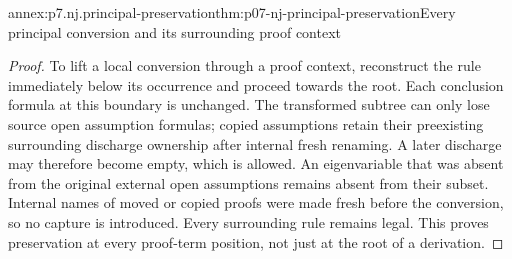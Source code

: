 \begin{annexitem}{annex:p7.nj.principal-preservation}{thm:p07-nj-principal-preservation}{Every principal conversion and its surrounding proof context}
\begin{proof}
To lift a local conversion through a proof context, reconstruct
the rule immediately below its occurrence and proceed towards
the root. Each conclusion formula at this boundary is unchanged.
The transformed subtree can only lose source open assumption
formulas; copied assumptions retain their preexisting surrounding
discharge ownership after internal fresh renaming. A later
discharge may therefore become empty, which is allowed.
An eigenvariable that was absent from the original external
open assumptions remains absent from their subset. Internal
names of moved or copied proofs were made fresh before the
conversion, so no capture is introduced. Every surrounding
rule remains legal. This proves preservation at every proof-term
position, not just at the root of a derivation.
\end{proof}
\end{annexitem}

